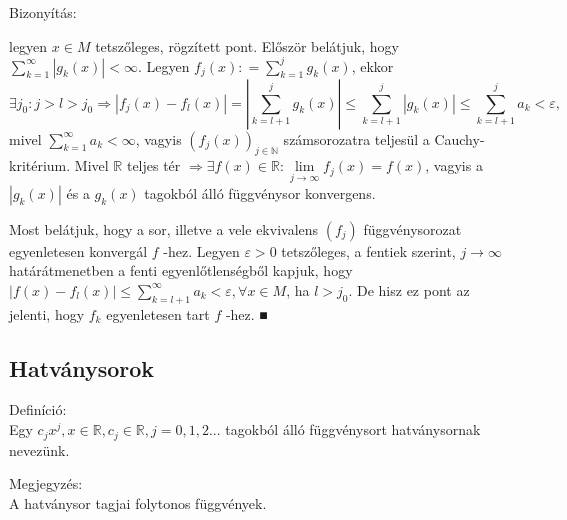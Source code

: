 \documentclass[12pt,a4paper]{scrartcl}
\newenvironment{definicio}{}{}
\newenvironment{bizonyitas}{}{}
\newenvironment{megjegyzes}{}{}
\begin{document}
\begin{bizonyitas}

Bizonyítás:

legyen \(x \in M\) tetszőleges, rögzített pont. Először belátjuk, hogy
\(\sum\limits_{k = 1}^{\infty}{\left| {g_{k}\left( x \right)} \right| < \infty}\).
Legyen
\(f_{j}\left( x \right): = {\sum\limits_{k = 1}^{j}{g_{k}\left( x \right)}}\),
ekkor
\[\left. \exists j_{0}:j > l > j_{0}\Rightarrow\left| {f_{j}\left( x \right) - f_{l}\left( x \right)} \right| = \left| {\sum\limits_{k = l + 1}^{j}{g_{k}\left( x \right)}} \right| \leq {\sum\limits_{k = l + 1}^{j}\left| {g_{k}\left( x \right)} \right|} \leq {\sum\limits_{k = l + 1}^{j}a_{k}} < \varepsilon, \right.\]
mivel \({\sum\limits_{k = 1}^{\infty}a_{k}} < \infty\), vagyis
\(\left( {f_{j}\left( x \right)} \right)_{j \in {\mathbb{N}}}\)
számsorozatra teljesül a Cauchy-kritérium. Mivel \(\mathbb{R}\) teljes
tér
\(\left. \Rightarrow\exists f\left( x \right) \in {\mathbb{R}}:\underset{j\rightarrow\infty}{\lim}f_{j}\left( x \right) = f\left( x \right) \right.\),
vagyis a \(\left| {g_{k}\left( x \right)} \right|\) és a
\(g_{k}\left( x \right)\) tagokból álló függvénysor konvergens.

Most belátjuk, hogy a sor, illetve a vele ekvivalens
\(\left( f_{j} \right)\) függvénysorozat egyenletesen konvergál \(f\)
-hez. Legyen \(\varepsilon > 0\) tetszőleges, a fentiek szerint,
\(\left. j\rightarrow\infty \right.\) határátmenetben a fenti
egyenlőtlenségből kapjuk, hogy
\(\left| {f\left( x \right) - f_{l}\left( x \right)} \right| \leq {\sum\limits_{k = l + 1}^{\infty}a_{k}} < \varepsilon,\forall x \in M\),
ha \(l > j_{0}\). De hisz ez pont az jelenti, hogy \(f_{k}\)
egyenletesen tart \(f\) -hez. ■

\end{bizonyitas}

\hypertarget{hatvanysorok}{%
\subsection{Hatványsorok}\label{hatvanysorok}}

\begin{definicio}

Definíció:\\
Egy
\(c_{j}x^{j},x \in {\mathbb{R}},c_{j} \in {\mathbb{R}},j = 0,1,2...\)
tagokból álló függvénysort hatványsornak nevezünk.

\end{definicio}

\begin{megjegyzes}

Megjegyzés:\\
A hatványsor tagjai folytonos függvények.

\end{megjegyzes}
\end{document}
